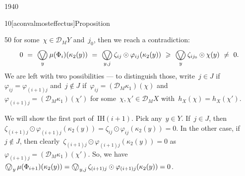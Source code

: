 \begin{parsec}{1940}
\begin{point}{10}[aconvalmosteffectus]{Proposition}
\begin{point}{50}
    for some~$\chi \in \mathcal{D}_M Y$ and~$j_0$,
    then we reach a contradiction:
\begin{equation*}
    0\ = \ 
    \bigovee_y \mu(\Phi_i)(\kappa_2(y))
    \ = \ \bigovee_{y,j} \zeta_{ij} \odot \varphi_{ij}(\kappa_2(y))
    \ \geq \ \bigovee_y \zeta_{ij_0} \odot \chi(y)\  \neq\  0.
\end{equation*}
We are left with two possibilities ---
    to distinguish those,
    write~$j \in J$ if~$\varphi_{ij} = \varphi_{(i+1)j}$
    and~$j \notin J$
    if~$\varphi_{ij} = (\mathcal{D}_M \kappa_1)(\chi)$
    and~$\varphi_{(i+1)j} = (\mathcal{D}_M \kappa_1)(\chi')$
    for some~$\chi,\chi' \in \mathcal{D}_M X$
    with~$h_X (\chi) = h_X(\chi')$.

    We will show the first part of~$\mathrm{IH}(i+1)$.
Pick any~$y \in Y$.
If~$j \in J$, then~$\zeta_{(i+1)j}\odot \varphi_{(i+1)j}(\kappa_2(y))
= \zeta_{ij} \odot \varphi_{ij}(\kappa_2(y)) = 0$.
In the other case, if~$j \notin J$,
then clearly~$\zeta_{(i+1)j}\odot \varphi_{(i+1)j}(\kappa_2(y)) = 0$
    as~$\varphi_{(i+1)j} = (\mathcal{D}_M \kappa_1)(\chi')$.
So, we have~$\bigovee_y \mu(\Phi_{i+1})(\kappa_2(y))
= \bigovee_{y,j} \zeta_{(i+1)j} \odot \varphi_{(i+1)j} (\kappa_2(y)) = 0 $.


\end{point}
\end{point}
\end{parsec}
